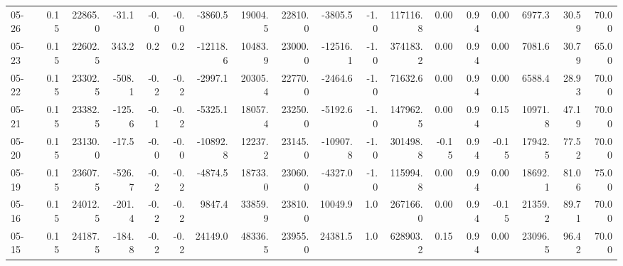 \begin{threeparttable}
{\begin{tabular}{lrrrrrrrrrrrrrrrrr}
  05-26 &     0.15 & 22865.0 &             -31.1 &              -0.0 &               -0.0 &            -3860.5 & 19004.5 & 22810.0 &    -3805.5 &                     -1.0 &            117116.8 &       0.00 &      0.94 &           0.00 &           6977.3 &           30.59 &                  70.00 \\
  05-23 &     0.15 & 22602.5 &             343.2 &               0.2 &                0.2 &           -12118.6 & 10483.9 & 23000.0 &   -12516.1 &                     -1.0 &            374183.2 &       0.00 &      0.94 &           0.00 &           7081.6 &           30.79 &                  65.00 \\
  05-22 &     0.15 & 23302.5 &            -508.1 &              -0.2 &               -0.2 &            -2997.1 & 20305.4 & 22770.0 &    -2464.6 &                     -1.0 &             71632.6 &       0.00 &      0.94 &           0.00 &           6588.4 &           28.93 &                  70.00 \\
  05-21 &     0.15 & 23382.5 &            -125.6 &              -0.1 &               -0.2 &            -5325.1 & 18057.4 & 23250.0 &    -5192.6 &                     -1.0 &            147962.5 &       0.00 &      0.94 &           0.15 &          10971.8 &           47.19 &                  70.00 \\
  05-20 &     0.15 & 23130.0 &             -17.5 &              -0.0 &               -0.0 &           -10892.8 & 12237.2 & 23145.0 &   -10907.8 &                     -1.0 &            301498.8 &      -0.15 &      0.94 &          -0.15 &          17942.5 &           77.52 &                  70.00 \\
  05-19 &     0.15 & 23607.5 &            -526.7 &              -0.2 &               -0.2 &            -4874.5 & 18733.0 & 23060.0 &    -4327.0 &                     -1.0 &            115994.8 &       0.00 &      0.94 &           0.00 &          18692.1 &           81.06 &                  75.00 \\
  05-16 &     0.15 & 24012.5 &            -201.4 &              -0.2 &               -0.2 &             9847.4 & 33859.9 & 23810.0 &    10049.9 &                      1.0 &            267166.0 &       0.00 &      0.94 &          -0.15 &          21359.2 &           89.71 &                  70.00 \\
  05-15 &     0.15 & 24187.5 &            -184.8 &              -0.2 &               -0.2 &            24149.0 & 48336.5 & 23955.0 &    24381.5 &                      1.0 &            628903.2 &       0.15 &      0.94 &           0.00 &          23096.5 &           96.42 &                  70.00 \\

\end{tabular}}
\end{threeparttable}
